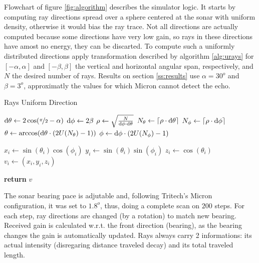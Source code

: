 Flowchart of figure \ref{fig:algorithm} describes the simulator logic. It starts
by computing ray directions spread over a sphere centered at the sonar with
uniform density, otherwise it would bias the ray trace. Not all directions are
actually computed because some directions have very low gain, so rays in these directions
have amost no energy, they can be discarted. To compute such a uniformly
distributed directions apply transformation described by algorithm
\ref{alg:urays} for $[-\alpha,\alpha]$ and $[-\beta,\beta]$ the vertical and
horizontal angular span, respectively, and $N$ the desired number of rays.
Results on section \ref{ss:results} use $\alpha = 30^o$ and $\beta = 3^o$,
approximatly the values for which Micron cannot detect the echo. 


\begin{algorithm}
\caption{Rays Uniform Direction}
\label{alg:urays}
\begin{algorithmic}

\State $\mathrm{d}\theta \gets 2\cos(\nicefrac{\pi}{2}-\alpha)$
\State $\mathrm{d}\phi \gets 2\beta $
\State $\rho \gets \sqrt{\frac{N}{\mathrm{d}\phi\cdot\mathrm{d}\theta}}$ 
\State $N_\theta \gets \lceil\rho\cdot\mathrm{d}\theta\rceil$
\State $N_\phi \gets \lceil\rho\cdot\mathrm{d}\phi\rceil$
\State $\theta \gets \arccos(\mathrm{d}\theta\cdot (2U(N_\theta)-1))$ 
\State $\phi \gets \mathrm{d}\phi\cdot (2U(N_\phi)-1)$

\State $x_i \gets \sin(\theta_i)\cos(\phi_i)$
\State $y_i \gets \sin(\theta_i)\sin(\phi_i)$
\State $z_i \gets \cos(\theta_i)$
\State $v_i \gets (x_i,y_i,z_i)$
\EndFor

\State \textbf{return} $v$
\EndProcedure
\end{algorithmic}
\end{algorithm}

The sonar bearing pace is adjutable and, following Tritech's Micron
configuration, it was set to $1.8^o$, thus, doing a complete scan on $200$ steps. For each step, ray
directions are changed (by a rotation) to match new bearing. Received gain is
calculated w.r.t. the front direction (bearing), as the bearing changes the gain
is automatically updated. Rays always carry 2 informations: its actual
intensity (disregaring distance traveled decay) and its total traveled length.

